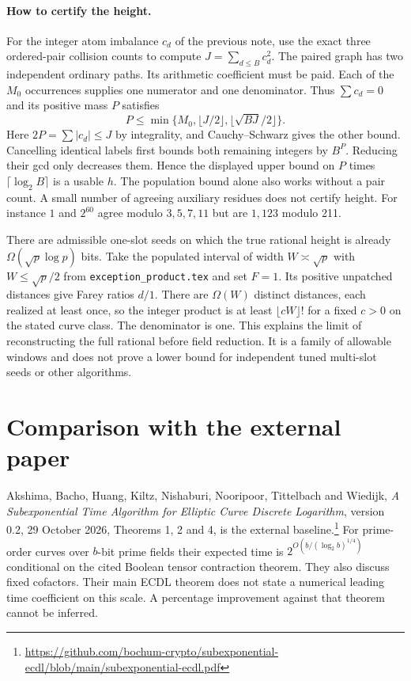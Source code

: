 \documentclass[11pt]{article}
\begin{document}
\paragraph{How to certify the height.}
For the integer atom imbalance $c_d$ of the previous note, use the
exact three ordered-pair collision counts to compute
$J=\sum_{d\le B}c_d^2$. The paired graph has two independent
ordinary paths. Its arithmetic coefficient must be paid. Each of
the $M_0$ occurrences supplies one numerator and one denominator.
Thus $\sum c_d=0$ and its positive mass $P$ satisfies
\[
 P\le \min\{M_0,\lfloor J/2\rfloor,\lfloor\sqrt{BJ}/2\rfloor\}.
\]
Here $2P=\sum|c_d|\le J$ by integrality, and Cauchy--Schwarz
gives the other bound. Cancelling identical labels first bounds
both remaining integers by $B^P$. Reducing their gcd only decreases
them. Hence the displayed upper bound on $P$ times
$\lceil\log_2 B\rceil$ is a usable $h$. The population bound alone
also works without a pair count. A small number of agreeing
auxiliary residues does not certify height. For instance $1$ and
$2^{60}$ agree modulo $3,5,7,11$ but are $1,123$ modulo 211.

There are admissible one-slot seeds on which the true rational
height is already $\Omega(\sqrt p\log p)$ bits. Take the populated
interval of width $W\asymp\sqrt p$ with $W\le\sqrt p/2$ from
\texttt{exception\_product.tex} and set $F=1$. Its positive
unpatched distances give Farey ratios $d/1$. There are
$\Omega(W)$ distinct distances, each realized at least once, so
the integer product is at least $\lfloor cW\rfloor!$ for a fixed
$c>0$ on the stated curve class. The denominator is one. This
explains the limit of reconstructing the full rational before field
reduction. It is a family of allowable windows and does not prove a
lower bound for independent tuned multi-slot seeds or other algorithms.

\section{Comparison with the external paper}
Akshima, Bacho, Huang, Kiltz, Nishaburi, Nooripoor, Tittelbach and
Wiedijk, \emph{A Subexponential Time Algorithm for Elliptic Curve
Discrete Logarithm}, version 0.2, 29 October 2026, Theorems 1, 2
and 4, is the external baseline.\footnote{\url{https://github.com/bochum-crypto/subexponential-ecdl/blob/main/subexponential-ecdl.pdf}}
For prime-order curves over $b$-bit prime fields their expected
time is $2^{O(b/(\log_2 b)^{1/4})}$ conditional on the cited
Boolean tensor contraction theorem. They also discuss fixed cofactors.
Their main ECDL theorem does not state a numerical leading time
coefficient on this scale. A percentage improvement against that
theorem cannot be inferred.
\end{document}
